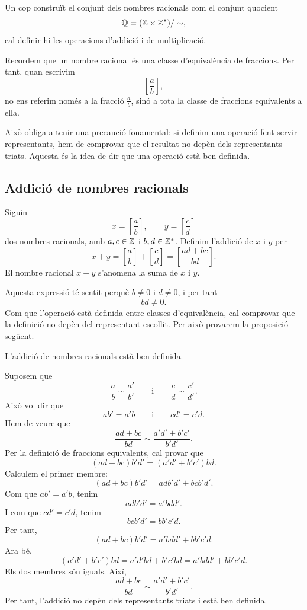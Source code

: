 Un cop construït el conjunt dels nombres racionals com el conjunt quocient
\[
	\mathbb{Q}=(\mathbb{Z}\times\mathbb{Z}^{*})/\sim,
\]
cal definir-hi les operacions d'addició i de multiplicació.

Recordem que un nombre racional és una classe d'equivalència de fraccions. Per tant, quan escrivim
\[
	\left[\frac{a}{b}\right],
\]
no ens referim només a la fracció \(\frac{a}{b}\), sinó a tota la classe de fraccions equivalents a ella.

Això obliga a tenir una precaució fonamental: si definim una operació fent servir representants, hem de comprovar que el resultat no depèn dels representants triats. Aquesta és la idea de dir que una operació està ben definida.

\subsection{Addició de nombres racionals}

Siguin
\[
	x=\left[\frac{a}{b}\right],
	\qquad
	y=\left[\frac{c}{d}\right]
\]
dos nombres racionals, amb \(a,c\in\mathbb{Z}\) i \(b,d\in\mathbb{Z}^{*}\). Definim l'addició de \(x\) i \(y\) per
\[
	x+y
	=
	\left[\frac{a}{b}\right]
	+
	\left[\frac{c}{d}\right]
	=
	\left[\frac{ad+bc}{bd}\right].
\]
El nombre racional \(x+y\) s'anomena la suma de \(x\) i \(y\).

Aquesta expressió té sentit perquè \(b\neq0\) i \(d\neq0\), i per tant
\[
	bd\neq0.
\]
Com que l'operació està definida entre classes d'equivalència, cal comprovar que la definició no depèn del representant escollit. Per això provarem la proposició següent.

\begin{proposicio}
L'addició de nombres racionals està ben definida.
\end{proposicio}

\begin{prova}
Suposem que
\[
	\frac{a}{b}\sim\frac{a'}{b'}
	\qquad\text{i}\qquad
	\frac{c}{d}\sim\frac{c'}{d'}.
\]
Això vol dir que
\[
	ab'=a'b
	\qquad\text{i}\qquad
	cd'=c'd.
\]
Hem de veure que
\[
	\frac{ad+bc}{bd}
	\sim
	\frac{a'd'+b'c'}{b'd'}.
\]
Per la definició de fraccions equivalents, cal provar que
\[
	(ad+bc)b'd'=(a'd'+b'c')bd.
\]
Calculem el primer membre:
\[
	(ad+bc)b'd'
	=
	adb'd'+bcb'd'.
\]
Com que \(ab'=a'b\), tenim
\[
	adb'd'=a'bdd'.
\]
I com que \(cd'=c'd\), tenim
\[
	bcb'd'=bb'c'd.
\]
Per tant,
\[
	(ad+bc)b'd'
	=
	a'bdd'+bb'c'd.
\]
Ara bé,
\[
	(a'd'+b'c')bd
	=
	a'd'bd+b'c'bd
	=
	a'bdd'+bb'c'd.
\]
Els dos membres són iguals. Així,
\[
	\frac{ad+bc}{bd}
	\sim
	\frac{a'd'+b'c'}{b'd'}.
\]
Per tant, l'addició no depèn dels representants triats i està ben definida.
\end{prova}

